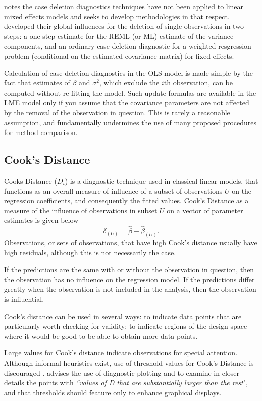 \documentclass[12pt, a4paper]{report}
\theoremstyle{definition}
\theoremstyle{remark}
\begin{document}
\citet{Christensen} notes the case deletion diagnostics techniques have not been applied to linear mixed effects models and seeks to develop methodologies in that respect. \citet{Christensen} developed their global influences for the deletion of single observations in two steps: a one-step estimate for the REML (or ML) estimate of the variance components, and an ordinary case-deletion diagnostic for a weighted resgression problem (conditional on the estimated covariance matrix) for fixed effects.


Calculation of case deletion diagnostics in the OLS model is made simple by the fact that estimates of $\beta$ and $\sigma^2$, which exclude the $i$th observation, can be computed without re-fitting the model. Such update formulas are available in the LME model only if you assume that the covariance parameters are not affected by the removal of the observation in question. This is rarely a reasonable assumption, and fundamentally undermines the use of many proposed procedures for method comparison.



\subsection{Cook's Distance}

 Cooks Distance ($D_{i}$) is a diagnostic technique used in classical linear models, that functions as an overall measure of influence of a subset of observations $U$ on the regression coefficients, and consequently the fitted values.  Cook's Distance as a measure of the influence of observations in subset $U$ on a vector of parameter estimates is given below \citep{cook77}
\[ \delta_{(U)} = \hat{\beta} - \hat{\beta}_{(U)}.\]
Observations, or sets of observations, that have high Cook's distance usually have high residuals, although this is not necessarily the case.


If the predictions are the same with or without the observation in question, then the observation has no influence on the regression model. If the predictions differ greatly when the observation is not included in the analysis, then the observation is influential.

 Cook's distance can be used in several ways: to indicate data points that are particularly worth checking for validity; to indicate regions of the design space where it would be good to be able to obtain more data points.


Large values for Cook's distance indicate observations for special attention. Although informal heuristics exist, use of threshold values for Cook's Distance is discouraged \citep{fox1991}. \citet{fox1991} advises the use of diagnostic plotting and to examine in closer details the points with \textit{``values of D that are substantially larger than the rest}", and that thresholds should feature only to enhance graphical displays.
\end{document}
